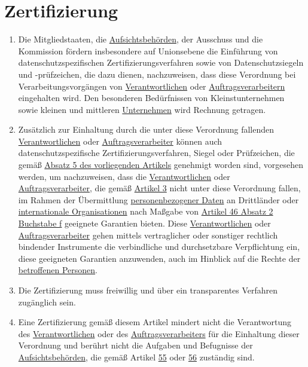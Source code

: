 \chapter{Zertifizierung}
\label{ch:42}

\begin{enumerate}

  \item Die Mitgliedstaaten, die \hyperref[itm:04-21]{Aufsichtsbehörden}, der Ausschuss und die Kommission fördern
   insbesondere auf Unionsebene die Einführung von datenschutzspezifischen Zertifizierungsverfahren sowie von
   Datenschutzsiegeln und -prüfzeichen, die dazu dienen, nachzuweisen, dass diese Verordnung bei Verarbeitungsvorgängen
   von
   \hyperref[itm:04-7]{Verantwortlichen} oder \hyperref[itm:04-8]{Auftragsverarbeitern} eingehalten wird. Den besonderen
    Bedürfnissen von Kleinstunternehmen sowie kleinen und mittleren \hyperref[itm:04-18]{Unternehmen} wird Rechnung
    getragen.%
  \label{itm:42-1}

  \item Zusätzlich zur Einhaltung durch die unter diese Verordnung fallenden \hyperref[itm:04-7]
   {Verantwortlichen} oder \hyperref[itm:04-8]{Auftragsverarbeiter} können auch datenschutzspezifische
   Zertifizierungsverfahren, Siegel oder Prüfzeichen, die gemäß \hyperref[itm:42-5]{Absatz 5 des vorliegenden Artikels}
   genehmigt worden sind, vorgesehen werden, um nachzuweisen, dass die
   \hyperref[itm:04-7]{Verantwortlichen} oder \hyperref[itm:04-8]{Auftragsverarbeiter}, die gemäß \hyperref[ch:3]
    {Artikel 3} nicht unter diese Verordnung fallen, im Rahmen der Übermittlung \hyperref[itm:04-1]
    {personenbezogener Daten} an Drittländer oder \hyperref[itm:04-26]{internationale Organisationen} nach Maßgabe
    von \hyperref[itm:46-2f]{Artikel 46 Absatz 2 Buchstabe f} geeignete Garantien bieten. Diese \hyperref[itm:04-7]
    {Verantwortlichen} oder \hyperref[itm:04-8]{Auftragsverarbeiter} gehen mittels vertraglicher oder sonstiger
    rechtlich bindender Instrumente die verbindliche und durchsetzbare Verpflichtung ein, diese geeigneten Garantien
    anzuwenden, auch im Hinblick auf die Rechte der
   \hyperref[itm:04-1]{betroffenen Personen}.%
  \label{itm:42-2}

  \item Die Zertifizierung muss freiwillig und über ein transparentes Verfahren zugänglich sein.%
  \label{itm:42-3}

  \item Eine Zertifizierung gemäß diesem Artikel mindert nicht die Verantwortung des \hyperref[itm:04-7]
   {Verantwortlichen} oder des
   \hyperref[itm:04-8]{Auftragsverarbeiters} für die Einhaltung dieser Verordnung und berührt nicht die Aufgaben und
    Befugnisse der
   \hyperref[itm:04-21]{Aufsichtsbehörden}, die gemäß Artikel \hyperref[ch:55]{55} oder \hyperref[ch:56]{56} zuständig
    sind.%
  \label{itm:42-4}


\end{enumerate}
